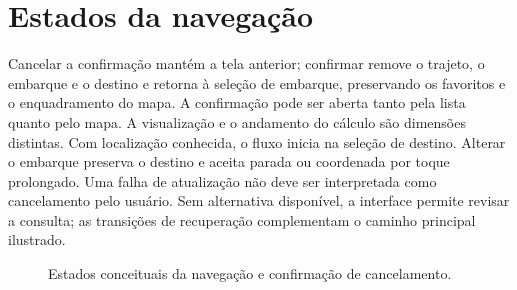 \section{Estados da navegação}
Cancelar a confirmação mantém a tela anterior; confirmar remove o trajeto, o embarque e o destino e retorna à seleção de embarque, preservando os favoritos e o enquadramento do mapa. A confirmação pode ser aberta tanto pela lista quanto pelo mapa. A visualização e o andamento do cálculo são dimensões distintas. Com localização conhecida, o fluxo inicia na seleção de destino. Alterar o embarque preserva o destino e aceita parada ou coordenada por toque prolongado. Uma falha de atualização não deve ser interpretada como cancelamento pelo usuário. Sem alternativa disponível, a interface permite revisar a consulta; as transições de recuperação complementam o caminho principal ilustrado.

\begin{figure}[H]
\centering
\caption{Estados conceituais da navegação e confirmação de cancelamento.}\label{fig:estados-pap}
\end{figure}

